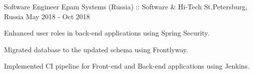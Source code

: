 \begin{cventries}
\cventry
{Software Engineer} %
{Epam Systems (Russia) :: Software \& Hi-Tech} %
{St.Petersburg, Russia} %
{May 2018 - Oct 2018} %
{
  \begin{cvitems} %
    \item {Enhanced user roles in back-end applications using Spring Security.}
    \item {Migrated database to the updated schema using Frontlyway.}
    \item {Implemented CI pipeline for Front-end and Back-end applications using Jenkins.}
  \end{cvitems}
}

\end{cventries}
